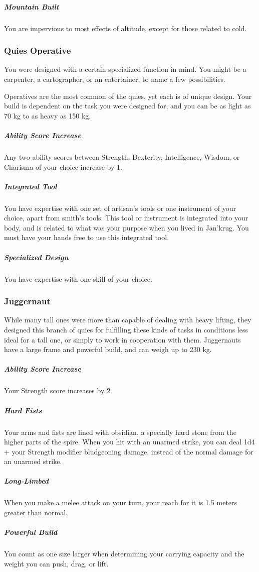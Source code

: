 \begin{linenumbers}
\subparagraph{Mountain Built} You are impervious to most effects of altitude, except for those related to cold.

\subsubsection{Quies Operative}
You were designed with a certain specialized function in mind.
You might be a carpenter, a cartographer, or an entertainer, to name a few possibilities.

Operatives are the most common of the quies, yet each is of unique design.
Your build is dependent on the task you were designed for, and you can be as light as 70 kg to as heavy as 150 kg.
\subparagraph{Ability Score Increase} Any two ability scores between Strength, Dexterity, Intelligence, Wisdom, or Charisma of your choice increase by 1.
\subparagraph{Integrated Tool} You have expertise with one set of artisan's tools or one instrument of your choice, apart from smith's tools.
This tool or instrument is integrated into your body, and is related to what was your purpose when you lived in Jan'krug.
You must have your hands free to use this integrated tool.
\subparagraph{Specialized Design} You have expertise with one skill of your choice.

\subsubsection{Juggernaut}
While many tall ones were more than capable of dealing with heavy lifting, they designed this branch of quies for fulfilling these kinds of tasks in conditions less ideal for a tall one, or simply to work in cooperation with them.
Juggernauts have a large frame and powerful build, and can weigh up to 230 kg.
\subparagraph{Ability Score Increase} Your Strength score increases by 2.
\subparagraph{Hard Fists} Your arms and fists are lined with obsidian, a specially hard stone from the higher parts of the spire.
When you hit with an unarmed strike, you can deal 1d4 + your Strength modifier bludgeoning damage, instead of the normal damage for an unarmed strike.
\subparagraph{Long-Limbed} When you make a melee attack on your turn, your reach for it is 1.5 meters greater than normal.
\subparagraph{Powerful Build} You count as one size larger when determining your carrying capacity and the weight you can push, drag, or lift.


\end{linenumbers}
